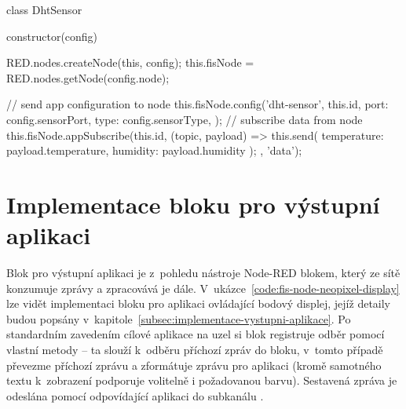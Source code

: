 \begin{code}[
    language=Javascript,
    label=code:fis-dht-app,
    caption={Detail implementace vstupní aplikace (z~hlediska centrálního uzlu) -- jedná se o~aplikaci pro
    senzory měřící teplotu a vlhkost okolí.
    Konstruktor této třídy je zodpovědný za konfiguraci aplikace na uzlu za pomoci metody \ic{config} a následnou
    registrace odběru zprávy z~uzlu -- funkce volaná na příchozí zprávy z~nich přejímá data a zasílá je dále do sítě
    nástroje Node-RED (volání \ic{this.send})}.
]
class DhtSensor {
    constructor(config) {
        RED.nodes.createNode(this, config);
        this.fisNode = RED.nodes.getNode(config.node);

        // send app configuration to node
        this.fisNode.config('dht-sensor', this.id, {
            port: config.sensorPort,
            type: config.sensorType,
        });
        // subscribe data from node
        this.fisNode.appSubscribe(this.id, (topic, payload) => {
            this.send({
                temperature: payload.temperature,
                humidity: payload.humidity
            });
        }, 'data');
    }
}
\end{code}

\section{Implementace bloku pro výstupní aplikaci}\label{sec:implementace-bloku-pro-vystupni-aplikace}
Blok pro výstupní aplikaci je z~pohledu nástroje Node-RED blokem, který ze sítě konzumuje zprávy a zpracovává je dále.
V~ukázce~\ref{code:fis-node-neopixel-display} lze vidět implementaci bloku pro aplikaci ovládající bodový displej,
jejíž detaily budou popsány v~kapitole~\ref{subsec:implementace-vystupni-aplikace}.
Po standardním zavedením cílové aplikace na uzel si blok registruje odběr pomocí vlastní metody  -- ta slouží
k~odběru příchozí zpráv do bloku, v~tomto případě převezme příchozí zprávu a zformátuje zprávu pro aplikaci
(kromě samotného textu k~zobrazení podporuje volitelně i požadovanou barvu).
Sestavená zpráva je odeslána pomocí  odpovídající aplikaci do subkanálu .

